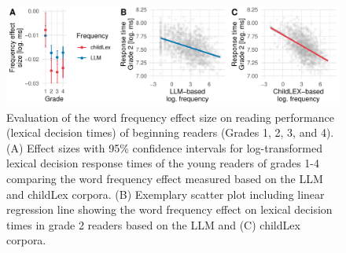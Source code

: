 \documentclass[doc, a4paper]{apa7}
\begin{document}
\begin{figure}[!htbp]
    \centering
    \includegraphics[scale=.8]{figures/exp1_ef_size.pdf}
    \caption{Evaluation of the word frequency effect size on reading performance (lexical decision times) of beginning readers (Grades 1, 2, 3, and 4). (A) Effect sizes with 95\% confidence intervals for log-transformed lexical decision response times of the young readers of grades 1-4 comparing the word frequency effect measured based on the LLM and childLex corpora. (B) Exemplary scatter plot including linear regression line showing the word frequency effect on lexical decision times in grade 2 readers based on the LLM and (C) childLex corpora.}
\label{fig:ef_size}
\end{figure}
\end{document}

